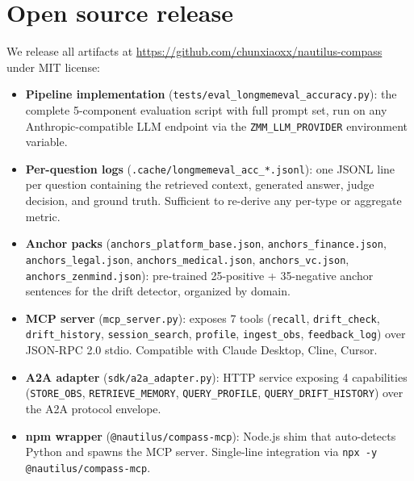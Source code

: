 
\section{Open source release}
\label{sec:opensource}

We release all artifacts at
\url{https://github.com/chunxiaoxx/nautilus-compass} under MIT license:

\begin{itemize}

\item \textbf{Pipeline implementation} (\texttt{tests/eval\_longmemeval\_accuracy.py}):
   the complete 5-component evaluation script with full prompt set, run on
   any Anthropic-compatible LLM endpoint via the \texttt{ZMM\_LLM\_PROVIDER}
   environment variable.

\item \textbf{Per-question logs} (\texttt{.cache/longmemeval\_acc\_*.jsonl}):
   one JSONL line per question containing the retrieved context, generated
   answer, judge decision, and ground truth.  Sufficient to re-derive
   any per-type or aggregate metric.

\item \textbf{Anchor packs} (\texttt{anchors\_platform\_base.json},
   \texttt{anchors\_finance.json}, \texttt{anchors\_legal.json},
   \texttt{anchors\_medical.json}, \texttt{anchors\_vc.json},
   \texttt{anchors\_zenmind.json}): pre-trained 25-positive + 35-negative
   anchor sentences for the drift detector, organized by domain.

\item \textbf{MCP server} (\texttt{mcp\_server.py}): exposes 7 tools
   (\texttt{recall}, \texttt{drift\_check}, \texttt{drift\_history},
   \texttt{session\_search}, \texttt{profile}, \texttt{ingest\_obs},
   \texttt{feedback\_log}) over JSON-RPC 2.0 stdio. Compatible with
   Claude Desktop, Cline, Cursor.

\item \textbf{A2A adapter} (\texttt{sdk/a2a\_adapter.py}): HTTP service
   exposing 4 capabilities (\texttt{STORE\_OBS}, \texttt{RETRIEVE\_MEMORY},
   \texttt{QUERY\_PROFILE}, \texttt{QUERY\_DRIFT\_HISTORY}) over the A2A
   protocol envelope.

\item \textbf{npm wrapper} (\texttt{@nautilus/compass-mcp}): Node.js
   shim that auto-detects Python and spawns the MCP server. Single-line
   integration via \texttt{npx -y @nautilus/compass-mcp}.


\end{itemize}
